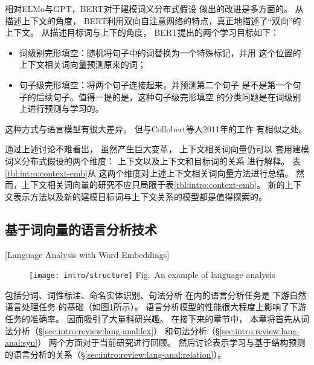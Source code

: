 相对ELMo与GPT，BERT对于建模词义分布式假设
做出的改进是多方面的。
从描述上下文的角度，
BERT利用双向自注意网络的特点，真正地描述了``双向''的上下文。
从描述目标词与上下的角度，
BERT提出的两个学习目标如下：
\begin{itemize}
	\item 词级别完形填空：随机将句子中的词替换为一个特殊标记，并用
	这个位置的上下文相关词向量预测原来的词；
	\item 句子级完形填空：将两个句子连接起来，并预测第二个句子
	是不是第一个句子的后续句子。值得一提的是，这种句子级完形填空
	的分类问题是在词级别上进行预测与学习的。
\end{itemize}

这种方式与语言模型有很大差异。
但与Collobert等人2011年的工作
有相似之处。

通过上述讨论不难看出，
虽然产生巨大变革，
上下文相关词向量仍可以
套用建模词义分布式假设的两个维度：
上下文以及上下文和目标词的关系
进行解释。
表\ref{tbl:intro:context-emb}从
这两个维度对上述上下文相关词向量方法进行总结。
然而，上下文相关词向量的研究不应只局限于表\ref{tbl:intro:context-emb}。
新的上下文表示方法以及新的建模目标词与上下文关系的模型都是值得探索的。

\subsection{基于词向量的语言分析技术}[Language Analysis with Word Embeddings]\label{sec:intro:review:lang-anal}
\begin{figure}[t]
	\centering
	\texttt{[image: intro/structure]}
	{Fig.~$\!$}{An example of language analysis\label{fig:intro:pipeline}}
\end{figure}

包括分词、词性标注、命名实体识别、句法分析
在内的语言分析任务是
下游自然语言处理任务
的基础（如图\ref{fig:intro:pipeline}所示）。
语言分析模型的性能很大程度上影响了下游任务的准确率。
因而吸引了大量科研兴趣。
在接下来的章节中，
本章将首先从词法分析（\S\ref{sec:intro:review:lang-anal:lex}）
和句法分析（\S\ref{sec:intro:review:lang-anal:syn}）
两个方面对于当前研究进行回顾。
然后讨论表示学习与基于结构预测的语言分析的关系（\S\ref{sec:intro:review:lang-anal:relation}）。

